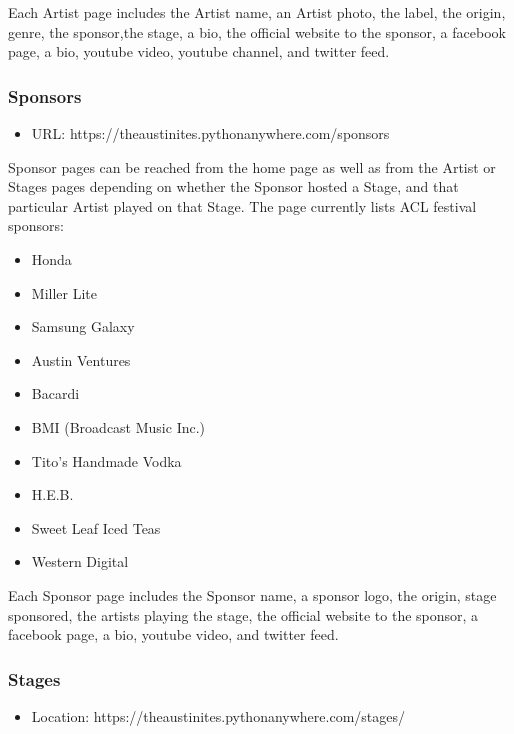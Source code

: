 \documentclass[12pt,english]{scrartcl}
\begin{document}
Each Artist page includes the Artist name, an Artist photo, the label, the origin, genre, the sponsor,the stage, a bio,
the official website to the sponsor, a facebook page, a bio, youtube video, youtube channel, and twitter feed.

\subsubsection{Sponsors}

\begin{itemize}
 \item URL: https://theaustinites.pythonanywhere.com/sponsors
\end{itemize}

Sponsor pages can be reached from the home page as well as from the Artist or Stages pages depending on whether the Sponsor hosted a
Stage, and that particular Artist played on that Stage. The page currently lists ACL festival sponsors:
\begin{itemize}
 \item Honda
 \item Miller Lite
 \item Samsung Galaxy
 \item Austin Ventures
 \item Bacardi
 \item BMI (Broadcast Music Inc.)
 \item Tito's Handmade Vodka
 \item H.E.B.
 \item Sweet Leaf Iced Teas
 \item Western Digital
\end{itemize}
Each Sponsor page includes the Sponsor name, a sponsor logo, the origin, stage sponsored, the artists playing the stage, the official website to the sponsor,
a facebook page, a bio, youtube video, and twitter feed.

\subsubsection{Stages}

\begin{itemize}
 \item Location: https://theaustinites.pythonanywhere.com/stages/
\end{itemize}
\end{document}
